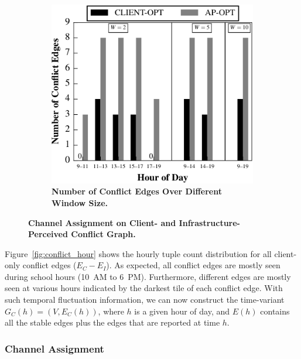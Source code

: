 \begin{figure}[t]
\begin{minipage}[b]{0.65\textwidth}
\begin{subfigure}[t]{0.49\textwidth}
      \label{fig:channel}
    \end{subfigure}\hspace*{0.02\textwidth}%
    \begin{subfigure}[t]{0.49\textwidth}
      \includegraphics[width=\textwidth]{./figures/DavisConflictEdgeMultiHour.pdf}
      \caption{\textbf{Number of Conflict Edges Over Different Window Size.}}
      \label{fig:window}
    \end{subfigure}
    \caption{\textbf{Channel Assignment on Client- and Infrastructure-Perceived
    Conflict Graph.}}
  \end{minipage}
  \vspace*{\aftercaptiongap}
\end{figure}



Figure~\ref{fig:conflict_hour} shows the hourly tuple count distribution for
all client-only conflict edges ($E_C-E_I$). As expected, all conflict edges
are mostly seen during school hours (10~AM to 6~PM). Furthermore, different
edges are mostly seen at various hours indicated by the darkest tile of each
conflict edge. With such temporal fluctuation information, we can now
construct the time-variant $G_C(h)=(V, E_C(h))$, where $h$ is a given hour of
day, and $E(h)$ contains all the stable edges plus the edges that are
reported at time $h$.


\subsubsection{Channel Assignment}



